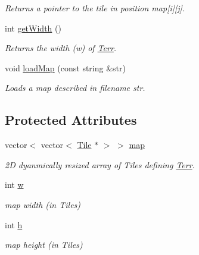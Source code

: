 \begin{DoxyCompactItemize}
\begin{DoxyCompactList}\small\item\em Returns a pointer to the tile in position map\mbox{[}i\mbox{]}\mbox{[}j\mbox{]}. \end{DoxyCompactList}\item 
int \hyperlink{class_terr_a397fdbbeb3fe3eb8989d9da77af42f57}{get\+Width} ()\hypertarget{class_terr_a397fdbbeb3fe3eb8989d9da77af42f57}{}\label{class_terr_a397fdbbeb3fe3eb8989d9da77af42f57}

\begin{DoxyCompactList}\small\item\em Returns the width (w) of \hyperlink{class_terr}{Terr}. \end{DoxyCompactList}\item 
void \hyperlink{class_terr_af53f4fdf0e1605b1536bde8c3fb77c9d}{load\+Map} (const string \&str)\hypertarget{class_terr_af53f4fdf0e1605b1536bde8c3fb77c9d}{}\label{class_terr_af53f4fdf0e1605b1536bde8c3fb77c9d}

\begin{DoxyCompactList}\small\item\em Loads a map described in filename str. \end{DoxyCompactList}\end{DoxyCompactItemize}
\subsection*{Protected Attributes}
\begin{DoxyCompactItemize}
\item 
vector$<$ vector$<$ \hyperlink{class_tile}{Tile} $\ast$ $>$ $>$ \hyperlink{class_terr_a35de374972704b3d92e76b4bc8e67a9c}{map}\hypertarget{class_terr_a35de374972704b3d92e76b4bc8e67a9c}{}\label{class_terr_a35de374972704b3d92e76b4bc8e67a9c}

\begin{DoxyCompactList}\small\item\em 2D dyanmically resized array of Tiles defining \hyperlink{class_terr}{Terr}. \end{DoxyCompactList}\item 
int \hyperlink{class_terr_af1d43d8b2b20b19d005626831c1335fb}{w}\hypertarget{class_terr_af1d43d8b2b20b19d005626831c1335fb}{}\label{class_terr_af1d43d8b2b20b19d005626831c1335fb}

\begin{DoxyCompactList}\small\item\em map width (in Tiles) \end{DoxyCompactList}\item 
int \hyperlink{class_terr_aa2f06b09cb8abd0fda4abb2b696f6885}{h}\hypertarget{class_terr_aa2f06b09cb8abd0fda4abb2b696f6885}{}\label{class_terr_aa2f06b09cb8abd0fda4abb2b696f6885}

\begin{DoxyCompactList}\small\item\em map height (in Tiles) \end{DoxyCompactList}\end{DoxyCompactItemize}


